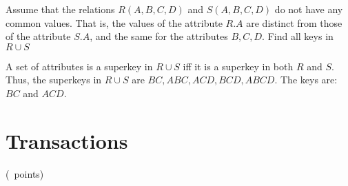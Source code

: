 \documentclass[addpoints,answers,12pt]{exam}
\begin{document}
\begin{questions}
\begin{parts}
\begin{subparts}
  \vfill

  \subpart Assume that the relations $R(A,B,C,D)$ and $S(A,B,C,D)$ do
  not have any common values.  That is, the values of the attribute
  $R.A$ are distinct from those of the attribute $S.A$, and the same
  for the attributes $B, C, D$.  Find all keys in $R \cup S$
  \begin{solution}
    A set of attributes is a superkey in $R \cup S$ iff it is a
    superkey in both $R$ and $S$. Thus, the superkeys in $R \cup S$
    are $BC, ABC, ACD, BCD, ABCD$.  The keys are: $BC$ and $ACD$.
  \end{solution}

  \vfill


\end{subparts}


\end{parts}

\newpage

\section{Transactions}

\question (\totalpoints\ points) 


\end{questions}
\end{document}
